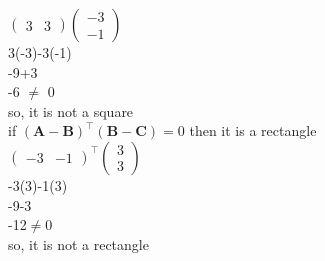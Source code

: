 \documentclass[10pt]{article}
\newcommand{\myvec}[1]{\ensuremath{\begin{pmatrix}#1\end{pmatrix}}}
\providecommand{\brak}[1]{\ensuremath{\left(#1\right)}}
\let\vec\mathbf
\begin{document}
\begin{enumerate}
$\myvec{3&3}{\myvec{-3\\-1}}$\\

3(-3)-3(-1)\\

-9+3\\

-6 $\neq$ 0\\

so, it is not a square\\

if $\brak{\vec{A}-\vec{B}}^{\top}\brak{\vec{B}-\vec{C}}=0$ then it is a rectangle\\

$\myvec{-3&-1}^{\top}{\myvec{3\\3}}$\\

-3(3)-1(3)\\

-9-3\\

-12$\neq$0\\

so, it is not a rectangle\\ 

\end{enumerate}
\end{document}

